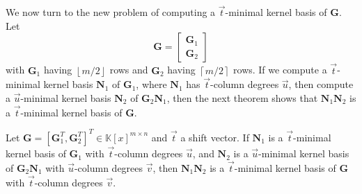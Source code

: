 We now turn to the new problem of computing a $\vec{t}$-minimal kernel
basis of $\mathbf{G}$. Let 
\[
\mathbf{G}=\left[\begin{array}{c}
\mathbf{G}_{1}\\
\mathbf{G}_{2}
\end{array}\right]
\]
 with $\mathbf{G}_{1}$ having $\left\lfloor m/2\right\rfloor $ rows
and $\mathbf{G}_{2}$ having $\left\lceil m/2\right\rceil $ rows.
If we compute a $\vec{t}$-minimal kernel basis $\mathbf{N}_{1}$
of $\mathbf{G}_{1}$, where $\mathbf{N}_{1}$ has $\vec{t}$-column
degrees $\vec{u}$, then compute a $\vec{u}$-minimal kernel basis
$\mathbf{N}_{2}$ of $\mathbf{G}_{2}\mathbf{N}_{1}$, then the next
theorem %
shows that $\mathbf{N}_{1}\mathbf{N}_{2}$ is a $\vec{t}$-minimal
kernel basis of $\mathbf{G}$. 
\begin{thm}
\label{thm:continueComputingNullspaceBasisByRows}Let %
$\mathbf{G}=\left[\mathbf{G}_{1}^{T},\mathbf{G}_{2}^{T}\right]^{T}\in\mathbb{K}\left[x\right]^{m\times n}$
and $\vec{t}$ a shift vector. If $\mathbf{N}_{1}$ is a $\vec{t}$-minimal
kernel basis of $\mathbf{G}_{1}$ with $\vec{t}$-column degrees $\vec{u}$,
and $\mathbf{N}_{2}$ is a $\vec{u}$-minimal kernel basis of $\mathbf{G}_{2}\mathbf{N}_{1}$
with $\vec{u}$-column degrees $\vec{v}$, then $\mathbf{N}_{1}\mathbf{N}_{2}$
is a $\vec{t}$-minimal kernel basis of $\mathbf{G}$ with $\vec{t}$-column
degrees $\vec{v}$.\end{thm}
